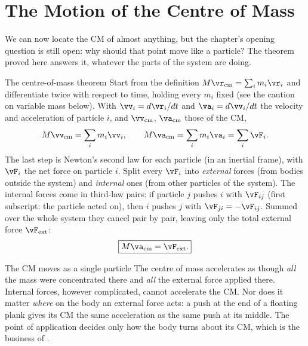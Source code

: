 \begin{figure}[htbp]
\centering
{}
\end{figure}

\section{The Motion of the Centre of Mass}

We can now locate the CM of almost anything, but the chapter's opening question is still open: why should
that point move like a particle? The theorem proved here answers it, whatever the parts of the system are doing.

\begin{derivbox}{The centre-of-mass theorem}
Start from the definition $M\vr_{\text{cm}}=\sum_i m_i\vr_i$ and differentiate twice with respect to
time, holding every $m_i$ fixed (see the caution on variable mass below). With $\vv_i=d\vr_i/dt$ and
$\va_i=d\vv_i/dt$ the velocity and acceleration of particle $i$, and $\vv_{\text{cm}}$, $\va_{\text{cm}}$
those of the CM,
\[
M\vv_{\text{cm}}=\sum_i m_i\vv_i,\qquad M\va_{\text{cm}}=\sum_i m_i\va_i=\sum_i \vF_i.
\]
The last step is Newton's second law for each particle (in an inertial frame), with $\vF_i$ the net force
on particle $i$. Split every $\vF_i$ into \emph{external} forces (from bodies outside the system) and
\emph{internal} ones (from other particles of the system). The internal forces come in third-law pairs: if
particle $j$ pushes $i$ with $\vF_{ij}$ (first subscript: the particle acted on), then $i$ pushes $j$ with
$\vF_{ji}=-\vF_{ij}$. Summed over the whole system they
cancel pair by pair, leaving only the total external force $\vF_{\text{ext}}$:
\[
\boxed{M\va_{\text{cm}}=\vF_{\text{ext}}.}
\]
\end{derivbox}

\begin{keybox}{The CM moves as a single particle}
The centre of mass accelerates as though \emph{all} the mass were concentrated there and \emph{all} the
external force applied there. Internal forces, however complicated, cannot accelerate the CM. Nor does it
matter \emph{where} on the body an external force acts: a push at the end of a floating plank gives its CM
the same acceleration as the same push at its middle. The point of application decides only how the body
turns about its CM, which is the business of .
\end{keybox}

